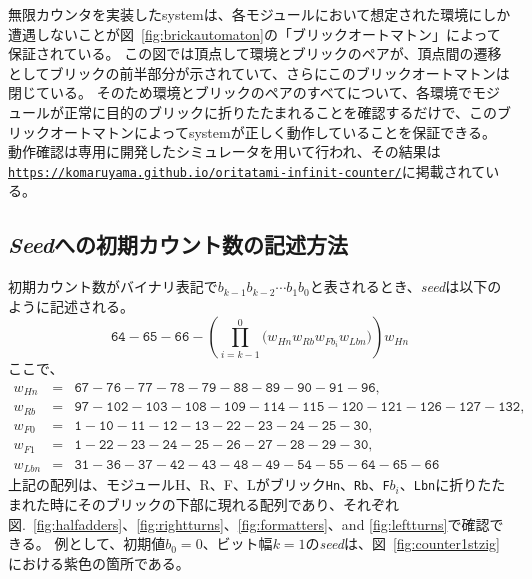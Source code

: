 \documentclass[a4j,11pt]{article}
\begin{document}
無限カウンタを実装したsystemは、各モジュールにおいて想定された環境にしか遭遇しないことが図~\ref{fig:brickautomaton}の「ブリックオートマトン」によって保証されている。
この図では頂点して環境とブリックのペアが、頂点間の遷移としてブリックの前半部分が示されていて、さらにこのブリックオートマトンは閉じている。
そのため環境とブリックのペアのすべてについて、各環境でモジュールが正常に目的のブリックに折りたたまれることを確認するだけで、このブリックオートマトンによってsystemが正しく動作していることを保証できる。
動作確認は専用に開発したシミュレータを用いて行われ、その結果は\href{https://komaruyama.github.io/oritatami-infinit-counter/}{\texttt{https://komaruyama.github.io/oritatami-infinit-counter/}}に掲載されている。

\subsection{\textit{Seed}への初期カウント数の記述方法}
初期カウント数がバイナリ表記で$b_{k-1}b_{k-2} \cdots b_1b_0$と表されるとき、\textit{seed}は以下のように記述される。
\begin{equation} \label{eq:zagencoding}
\texttt{64}{-}\texttt{65}{-}\texttt{66}{-}\left( \prod^0_{i = k-1} \bigl(  w_{Hn} w_{Rb} w_{Fb_i} w_{Lbn} \bigr) \right) w_{Hn}
\end{equation}
ここで、
\begin{eqnarray*}
w_{Hn} &=& \texttt{67}{-}\texttt{76}{-}\texttt{77}{-}\texttt{78}{-}\texttt{79}{-}\texttt{88}{-}\texttt{89}{-}\texttt{90}{-}\texttt{91}{-}\texttt{96},\\
w_{Rb} &=& \texttt{97}{-}\texttt{102}{-}\texttt{103}{-}\texttt{108}{-}\texttt{109}{-}\texttt{114}{-}\texttt{115}{-}\texttt{120}{-}\texttt{121}{-}\texttt{126}{-}\texttt{127}{-}\texttt{132},\\
w_{F0} &=& \texttt{1}{-}\texttt{10}{-}\texttt{11}{-}\texttt{12}{-}\texttt{13}{-}\texttt{22}{-}\texttt{23}{-}\texttt{24}{-}\texttt{25}{-}\texttt{30},\\
w_{F1} &=& \texttt{1}{-}\texttt{22}{-}\texttt{23}{-}\texttt{24}{-}\texttt{25}{-}\texttt{26}{-}\texttt{27}{-}\texttt{28}{-}\texttt{29}{-}\texttt{30},\\
 w_{Lbn} &=& \texttt{31}{-}\texttt{36}{-}\texttt{37}{-}\texttt{42}{-}\texttt{43}{-}\texttt{48}{-}\texttt{49}{-}\texttt{54}{-}\texttt{55}{-}\texttt{64}{-}\texttt{65}{-}\texttt{66}
\end{eqnarray*}
上記の配列は、モジュールH、R、F、Lがブリック\texttt{Hn}、\texttt{Rb}、\texttt{F}$b_i$、\texttt{Lbn}に折りたたまれた時にそのブリックの下部に現れる配列であり、それぞれ図.~\ref{fig:halfadders}、\ref{fig:rightturns}、\ref{fig:formatters}、and \ref{fig:leftturns}で確認できる。
例として、初期値$b_0 = 0$、ビット幅$k = 1$の\textit{seed}は、図~\ref{fig:counter1stzig}における紫色の箇所である。
\end{document}
